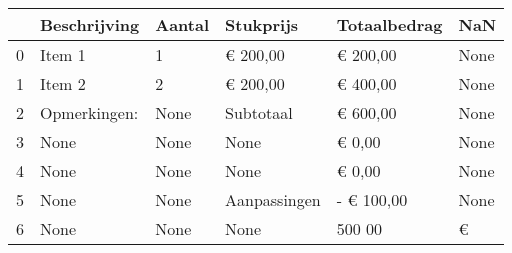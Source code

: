 \begin{tabular}{llllll}
\toprule
{} &  Beschrijving & Aantal &     Stukprijs & Totaalbedrag &   NaN \\
\midrule
0 &        Item 1 &      1 &      € 200,00 &     € 200,00 &  None \\
1 &        Item 2 &      2 &      € 200,00 &     € 400,00 &  None \\
2 &  Opmerkingen: &   None &     Subtotaal &     € 600,00 &  None \\
3 &          None &   None &          None &       € 0,00 &  None \\
4 &          None &   None &          None &       € 0,00 &  None \\
5 &          None &   None &  Aanpassingen &   - € 100,00 &  None \\
6 &          None &   None &          None &       500 00 &     € \\
\bottomrule
\end{tabular}
